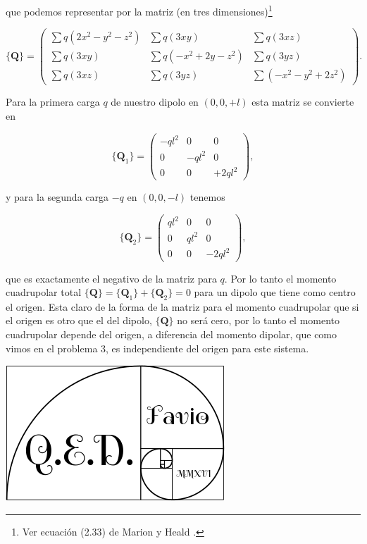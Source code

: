 \documentclass[a4paper,11pt]{article}
\numberwithin{equation}{section}
\begin{document}
que podemos representar por la matriz (en tres dimensiones)\footnote{Ver ecuación 
(2.33) de Marion y Heald \cite{marion2}.}


\begin{equation}
 \{ \mathbf{Q} \} = \begin{pmatrix}
                     \sum q(2x^2 - y^2 - z^2) & \sum q(3xy) & \sum q(3xz) \\
                     \sum q(3xy) & \sum q(-x^2 + 2y - z^2) & \sum q(3yz) \\
                     \sum q(3xz) & \sum q(3yz) & \sum(-x^2 - y^2 + 2z^2)
                    \end{pmatrix}.
\end{equation}

Para la primera carga $q$ de nuestro dipolo en $(0,0,+l)$ esta matriz se convierte en 

\begin{equation}
 \{ \mathbf{Q}_1 \} = \begin{pmatrix}
                     -ql^2 & 0 & 0 \\
                     0 & -ql^2 & 0 \\
                     0 & 0 & +2ql^2
                    \end{pmatrix},
\end{equation}

y para la segunda carga $-q$ en $(0,0,-l)$ tenemos 

\begin{equation}
 \{ \mathbf{Q}_2 \} = \begin{pmatrix}
                     ql^2 & 0 & 0 \\
                     0 & ql^2 & 0 \\
                     0 & 0 & -2ql^2
                    \end{pmatrix},
\end{equation}

que es exactamente el negativo de la matriz para $q$. Por lo tanto el momento cuadrupolar 
total $\{ \mathbf{Q} \} = \{ \mathbf{Q}_1 \} + \{ \mathbf{Q}_2 \} = 0$ para un dipolo 
que tiene como centro el origen. Esta claro de la forma de la matriz para el momento 
cuadrupolar que si el origen es otro que el del dipolo, $\{ \mathbf{Q} \}$ no será 
cero, por lo tanto el momento cuadrupolar depende del origen, a diferencia del momento 
dipolar, que como vimos en el problema 3, es independiente del origen para este sistema.

\hspace{10cm}\includegraphics[scale=0.25]{logoQED}
\end{document}
